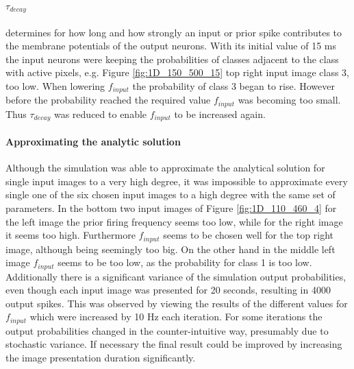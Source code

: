 \paragraph{$\tau_{decay}$} determines for how long and how strongly an input or prior spike contributes to the membrane potentials of the output neurons. With its initial value of 15 ms the input neurons were keeping the probabilities of classes adjacent to the class with active pixels, e.g. Figure \ref{fig:1D_150_500_15} top right input image class 3, too low. When lowering $f_{input}$ the probability of class 3 began to rise. However before the probability reached the required value $f_{input}$ was becoming too small. Thus $\tau_{decay}$ was reduced to enable $f_{input}$ to be increased again.

\paragraph{Approximating the analytic solution}
Although the simulation was able to approximate the analytical solution for single input images to a very high degree, it was impossible to approximate every single one of the six chosen input images to a high degree with the same set of parameters. In the bottom two input images of Figure \ref{fig:1D_110_460_4} for the left image the prior firing frequency seems too low, while for the right image it seems too high. Furthermore $f_{input}$ seems to be chosen well for the top right image, although being seemingly too big. On the other hand in the middle left image $f_{input}$ seems to be too low, as the probability for class 1 is too low.
Additionally there is a significant variance of the simulation output probabilities, even though each input image was presented for 20 seconds, resulting in 4000 output spikes. This was observed by viewing the results of the different values for $f_{input}$ which were increased by 10 Hz each iteration. For some iterations the output probabilities changed in the counter-intuitive way, presumably due to stochastic variance. If necessary the final result could be improved by increasing the image presentation duration significantly.